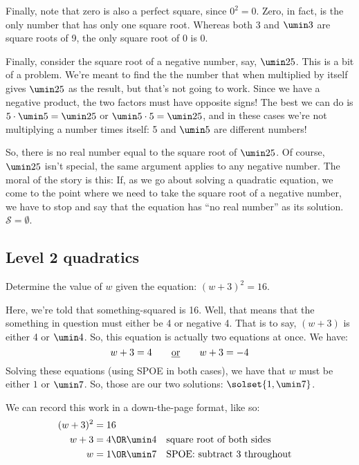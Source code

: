 Finally, note that zero is also a perfect square, since $0^2 = 0$. Zero, in fact, is the only number that has only one square root. Whereas both 3 and $\umin3$ are square roots of 9, the only square root of 0 is 0.

Finally, consider the square root of a negative number, say, $\umin25$. This is a bit of a problem. We're meant to find the the number that when multiplied by itself gives $\umin25$ as the result, but that's not going to work. Since we have a negative product, the two factors must have opposite signs! The best we can do is $5\cdot\umin5 = \umin25$ or $\umin5\cdot5 = \umin25$, and in these cases we're not multiplying a number times itself: 5 and $\umin5$ are different numbers!

So, there is no real number equal to the square root of $\umin25$. Of course, $\umin25$ isn't special, the same argument applies to any negative number. The moral of the story is this: If, as we go about solving a quadratic equation, we come to the point where we need to take the square root of a negative number, we have to stop and say that the equation has ``no real number'' as its solution. $\mathcal{S}=\emptyset$.


\subsection{Level 2 quadratics}

\begin{boxedexplore}
Determine the value of $w$ given the equation: $(w+3)^2 = 16$.
\end{boxedexplore} %

Here, we're told that something-squared is 16. Well, that means that the something in question must either be 4 or negative 4. That is to say, $(w+3)$ is either 4 or $\umin4$. So, this equation is actually two equations at once. We have:
\[w+3 = 4 \qquad\text{\underline{or}}\qquad w+3 = -4\]
Solving these equations (using SPOE in both cases), we have that $w$ must be either $1$ or $\umin7$. So, those are our two solutions: $\solset{1,\umin7}$.

We can record this work in a down-the-page format, like so:
\begin{align*}
(w+3)^2 &= 16
\\
w+3 &= 4 \OR \umin4
&&\text{square root of both sides}
\\
w &= 1 \OR \umin7
&&\text{SPOE: subtract 3 throughout}
\end{align*}

